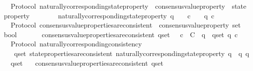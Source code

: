 \begin{isabellebody}
\isamarkupfalse%
%
\endisatagproof
{\isafoldproof}%
%
\isadelimproof
\isanewline
%
\endisadelimproof
\isanewline
\isanewline
\isanewline
\isanewline
{}\isamarkupfalse%
\ {\isacharparenleft}\ Protocol{\isacharparenright}\ naturally{\isacharunderscore}corresponding{\isacharunderscore}state{\isacharunderscore}property\ {\isacharcolon}{\isacharcolon}\ {\isachardoublequoteopen}consensus{\isacharunderscore}value{\isacharunderscore}property\ {\isasymRightarrow}\ state{\isacharunderscore}property{\isachardoublequoteclose}\isanewline
\ \ \ \isanewline
\ \ \ \ {\isachardoublequoteopen}naturally{\isacharunderscore}corresponding{\isacharunderscore}state{\isacharunderscore}property\ q\ {\isacharequal}\ {\isacharparenleft}{\isasymlambda}{\isasymsigma}{\isachardot}\ {\isasymforall}\ c\ {\isasymin}\ {\isasymepsilon}\ {\isasymsigma}{\isachardot}\ q\ c{\isacharparenright}{\isachardoublequoteclose}\isanewline
\isanewline
\isanewline
{}\isamarkupfalse%
\ {\isacharparenleft}\ Protocol{\isacharparenright}\ consensus{\isacharunderscore}value{\isacharunderscore}properties{\isacharunderscore}are{\isacharunderscore}consistent\ {\isacharcolon}{\isacharcolon}\ {\isachardoublequoteopen}consensus{\isacharunderscore}value{\isacharunderscore}property\ set\ {\isasymRightarrow}\ bool{\isachardoublequoteclose}\isanewline
\ \ \isanewline
\ \ \ \ {\isachardoublequoteopen}consensus{\isacharunderscore}value{\isacharunderscore}properties{\isacharunderscore}are{\isacharunderscore}consistent\ q{\isacharunderscore}set\ {\isacharequal}\ {\isacharparenleft}{\isasymexists}\ c\ {\isasymin}\ C{\isachardot}\ {\isasymforall}\ q\ {\isasymin}\ q{\isacharunderscore}set{\isachardot}\ q\ c{\isacharparenright}{\isachardoublequoteclose}\isanewline
\isanewline
\isanewline
{}\isamarkupfalse%
\ {\isacharparenleft}\ Protocol{\isacharparenright}\ naturally{\isacharunderscore}corresponding{\isacharunderscore}consistency\ {\isacharcolon}\isanewline
\ \ {\isachardoublequoteopen}{\isasymforall}\ q{\isacharunderscore}set{\isachardot}\ state{\isacharunderscore}properties{\isacharunderscore}are{\isacharunderscore}consistent\ {\isacharbraceleft}naturally{\isacharunderscore}corresponding{\isacharunderscore}state{\isacharunderscore}property\ q\ {\isacharbar}\ q{\isachardot}\ q\ {\isasymin}\ q{\isacharunderscore}set{\isacharbraceright}\isanewline
\ \ {\isasymlongrightarrow}\ consensus{\isacharunderscore}value{\isacharunderscore}properties{\isacharunderscore}are{\isacharunderscore}consistent\ q{\isacharunderscore}set{\isachardoublequoteclose}\isanewline

\end{isabellebody}
